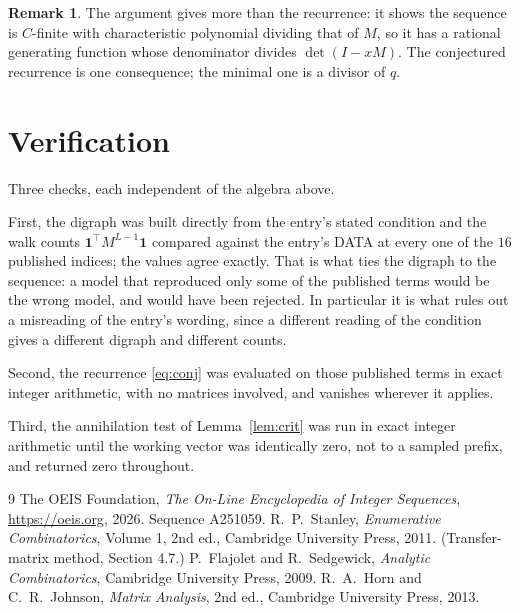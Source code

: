 \documentclass[11pt,a4paper]{article}
\theoremstyle{plain}
\theoremstyle{definition}
\newtheorem{remark}[theorem]{Remark}
\begin{document}
\begin{remark}
The argument gives more than the recurrence: it shows the sequence is $C$-finite with
characteristic polynomial dividing that of $M$, so it has a rational generating function
whose denominator divides $\det(I-xM)$. The conjectured recurrence is one consequence; the
minimal one is a divisor of $q$.
\end{remark}

\section{Verification}

Three checks, each independent of the algebra above.

First, the digraph was built directly from the entry's stated condition and the walk counts
$\mathbf{1}^{\!\top}M^{L-1}\mathbf{1}$ compared against the entry's DATA at
every one of the $16$ published indices; the values agree exactly. That is what ties
the digraph to the sequence: a model that reproduced only some of the published terms would
be the wrong model, and would have been rejected. In particular it is what rules out a
misreading of the entry's wording, since a different reading of the condition gives a
different digraph and different counts.

Second, the recurrence \eqref{eq:conj} was evaluated on those published terms in exact
integer arithmetic, with no matrices involved, and vanishes wherever it applies.

Third, the annihilation test of Lemma~\ref{lem:crit} was run in exact integer arithmetic
until the working vector was identically zero, not to a sampled prefix, and returned zero
throughout.

\begin{thebibliography}{9}
 The OEIS Foundation, \emph{The On-Line Encyclopedia of Integer
Sequences}, \url{https://oeis.org}, 2026. Sequence A251059.
 R.~P.~Stanley, \emph{Enumerative Combinatorics}, Volume 1, 2nd ed.,
Cambridge University Press, 2011. (Transfer-matrix method, Section 4.7.)
 P.~Flajolet and R.~Sedgewick, \emph{Analytic Combinatorics}, Cambridge
University Press, 2009.
 R.~A.~Horn and C.~R.~Johnson, \emph{Matrix Analysis}, 2nd ed., Cambridge
University Press, 2013.
\end{thebibliography}
\end{document}
